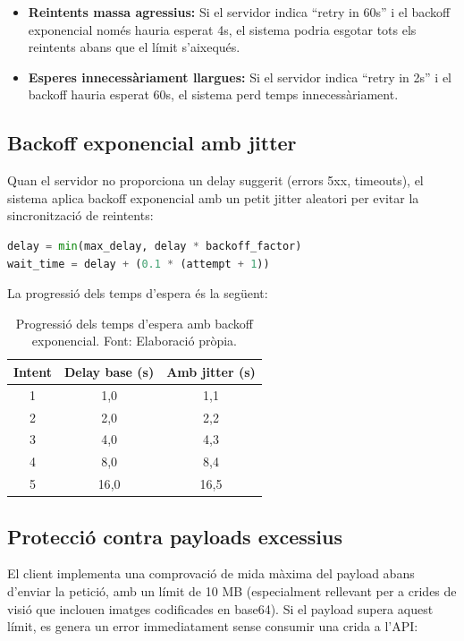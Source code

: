 \documentclass[12pt,a4paper,twoside]{report}
\begin{document}
\begin{itemize}
    \item \textbf{Reintents massa agressius:} Si el servidor indica ``retry in 60s'' i el backoff exponencial nom\'es hauria esperat 4s, el sistema podria esgotar tots els reintents abans que el l\'imit s'aixequ\'es.
    \item \textbf{Esperes innecess\`ariament llargues:} Si el servidor indica ``retry in 2s'' i el backoff hauria esperat 60s, el sistema perd temps innecess\`ariament.
\end{itemize}

\subsection{Backoff exponencial amb jitter}

Quan el servidor no proporciona un delay suggerit (errors 5xx, timeouts), el sistema aplica backoff exponencial amb un petit jitter aleatori per evitar la sincronitzaci\'o de reintents:

\begin{lstlisting}[language=Python]
delay = min(max_delay, delay * backoff_factor)
wait_time = delay + (0.1 * (attempt + 1))
\end{lstlisting}

La progressi\'o dels temps d'espera \'es la seg\"uent:

\begin{table}[H]
\centering
\caption{Progressi\'o dels temps d'espera amb backoff exponencial. Font: Elaboraci\'o pr\`opia.}
\label{tab:backoff}
\begin{tabular}{@{}ccc@{}}
\toprule
\textbf{Intent} & \textbf{Delay base (s)} & \textbf{Amb jitter (s)} \\
\midrule
1 & 1{,}0 & 1{,}1 \\
2 & 2{,}0 & 2{,}2 \\
3 & 4{,}0 & 4{,}3 \\
4 & 8{,}0 & 8{,}4 \\
5 & 16{,}0 & 16{,}5 \\
\bottomrule
\end{tabular}
\end{table}

\subsection{Protecci\'o contra payloads excessius}

El client implementa una comprovaci\'o de mida m\`axima del payload abans d'enviar la petici\'o, amb un l\'imit de 10 MB (especialment rellevant per a crides de visi\'o que inclouen imatges codificades en base64). Si el payload supera aquest l\'imit, es genera un error immediatament sense consumir una crida a l'API:
\end{document}
